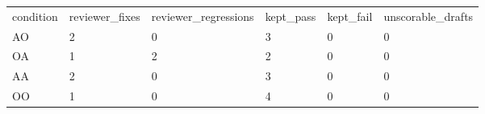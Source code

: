 \begin{tabular}{llllll}
condition & reviewer\_fixes & reviewer\_regressions & kept\_pass & kept\_fail & unscorable\_drafts \\
AO & 2 & 0 & 3 & 0 & 0 \\
OA & 1 & 2 & 2 & 0 & 0 \\
AA & 2 & 0 & 3 & 0 & 0 \\
OO & 1 & 0 & 4 & 0 & 0 \\
\end{tabular}
